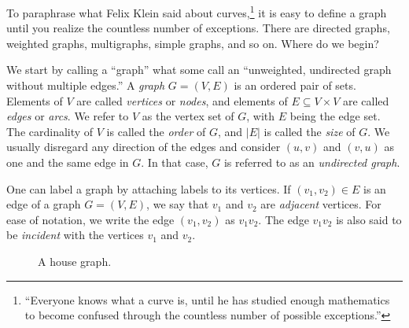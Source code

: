 \noindent
To paraphrase what Felix Klein said about curves,\footnote{
``Everyone knows what a curve is, until he has studied enough
mathematics to become confused through the countless number of
possible exceptions.''}
it is easy to define a graph until you realize the countless number of
exceptions. There are directed graphs, weighted graphs, multigraphs,
simple graphs, and so on. Where do we begin?

We start by calling a ``graph'' what some call an ``unweighted,
undirected graph without multiple edges.'' A \emph{graph}
$G = (V, E)$ is an ordered pair of sets. Elements of $V$ are called
\emph{vertices} or \emph{nodes}, and elements of
$E \subseteq V \times V$ are called \emph{edges} or
\emph{arcs}. We refer to $V$ as the vertex set of $G$, with $E$ being
the edge set. The cardinality of $V$ is called the
\emph{order} of $G$, and $|E|$ is called the
\emph{size} of $G$. We usually disregard any direction of
the edges and consider $(u,v)$ and $(v,u)$ as one and the same edge in
$G$. In that case, $G$ is referred to as an
\emph{undirected graph}.

One can label a graph by attaching labels to its vertices. If $(v_1,
v_2) \in E$ is an edge of a graph $G = (V, E)$, we say that $v_1$ and
$v_2$ are \emph{adjacent} vertices. For ease of notation, we write the
edge $(v_1, v_2)$ as $v_1 v_2$. The edge $v_1 v_2$ is also said to be
\emph{incident} with the vertices $v_1$ and $v_2$.

\begin{figure}[!htbp]
\centering
{}
\caption{A house graph.}
\label{fig:introduction:house_graph}
\end{figure}

